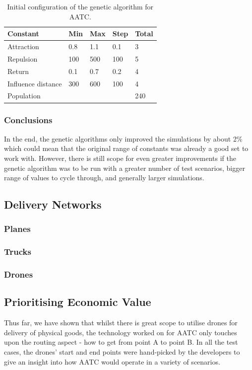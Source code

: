 \documentclass[a4paper,12pt,titlepage]{article}
\begin{document}
\begin{table}[!hbpt]
\centering
\begin{tabular}{|l|l|l|l|l|}
\hline
Constant           & Min & Max & Step & Total \\ \hline
Attraction         & 0.8 & 1.1 & 0.1    & 3     \\ \hline
Repulsion          & 100 & 500 & 100  & 5     \\ \hline
Return             & 0.1 & 0.7 & 0.2  & 4     \\ \hline
Influence distance & 300 & 600 & 100  & 4     \\ \hline
\multicolumn{4}{|l|}{Population}      & 240   \\ \hline
\end{tabular}
\caption{Initial configuration of the genetic algorithm for AATC. \cite{Balaji2017}}
\label{tab:gen_alg}
\end{table}

\subsubsection{Conclusions}
In the end, the genetic algorithms only improved the simulations by about 2\%\cite{Balaji2017} which could mean that the original range of constants was already a good set to work with. However, there is still scope for even greater improvements if the genetic algorithm was to be run with a greater number of test scenarios, bigger range of values to cycle through, and generally larger simulations.

\subsection{Delivery Networks}

\subsubsection{Planes}
\subsubsection{Trucks}
\subsubsection{Drones}

\subsection{Prioritising Economic Value}
Thus far, we have shown that whilst there is great scope to utilise drones for delivery of physical goods, the technology worked on for AATC only touches upon the routing aspect - how to get from point A to point B. In all the test cases, the drones' start and end points were hand-picked by the developers\cite{Balaji2017} to give an insight into how AATC would operate in a variety of scenarios.
\end{document}
